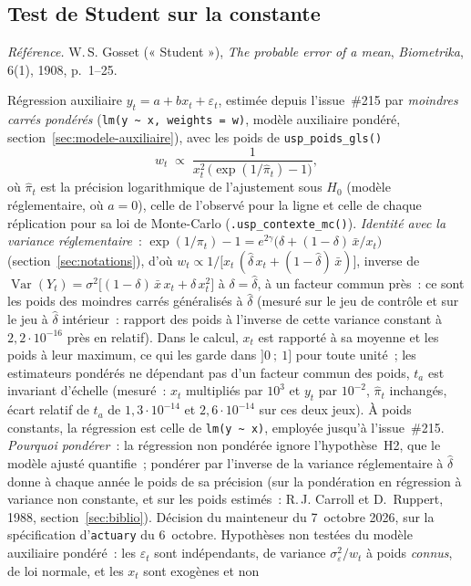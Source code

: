 \documentclass[a4paper,11pt]{article}
\newcommand{\code}[1]{\texttt{\small #1}}
\newcommand{\refl}[1]{{\small\textcolor{maincolor!70!black}{\textit{Référence.} #1}}\par\smallskip}
\newcounter{ficheid}
\newenvironment{fiche}[1]{%
  \stepcounter{ficheid}%
  \phantomsection
  \subsection{#1}%
  \label{fiche:\theficheid}%
}{%
  \end{description}\vspace{0.5em}%
}
\newcommand{\Cadre}{%
  \begin{description}[leftmargin=0pt, style=unboxed, itemsep=3pt, topsep=3pt, parsep=2pt]%
  \item[\textcolor{financeblue}{\textbf{1. Cadre, notations et hypothèses de validité (non testées).}}]}
\begin{document}
\begin{fiche}{Test de Student sur la constante}
\label{fiche:student-constante}%
\refl{W.\,S. Gosset (« Student »), \emph{The probable error of a mean}, \emph{Biometrika}, 6(1),
1908, p.~1--25.}
\Cadre
Régression auxiliaire $y_t = a + b x_t + \varepsilon_t$, estimée depuis l'issue~\#215 par
\emph{moindres carrés pondérés} (\code{lm(y \textasciitilde\ x, weights = w)}, modèle auxiliaire
pondéré, section~\ref{sec:modele-auxiliaire}), avec les poids de \code{usp\_poids\_gls()}
\[
  w_t \;\propto\; \frac{1}{x_t^2\,\big(\exp(1/\hat\pi_t) - 1\big)},
\]
où $\hat\pi_t$ est la précision logarithmique de l'ajustement sous $H_0$ (modèle réglementaire,
où $a = 0$), celle de l'observé pour la ligne et celle de chaque réplication pour sa loi de
Monte-Carlo (\code{.usp\_contexte\_mc()}). \emph{Identité avec la variance réglementaire}~:
$\exp(1/\pi_t) - 1 = e^{2\gamma}\big(\delta + (1-\delta)\,\bar x/x_t\big)$
(section~\ref{sec:notations}), d'où
$w_t \propto 1/\big[x_t\,(\hat\delta\, x_t + (1-\hat\delta)\,\bar x)\big]$, inverse de
$\operatorname{Var}(Y_t) = \sigma^2\big[(1-\delta)\,\bar x\,x_t + \delta\,x_t^2\big]$ à
$\delta = \hat\delta$, à un facteur commun près~: ce sont les poids des moindres carrés
généralisés à $\hat\delta$ (mesuré sur le jeu de contrôle et sur le jeu à $\hat\delta$ intérieur~:
rapport des poids à l'inverse de cette variance constant à $2{,}2\cdot 10^{-16}$ près en relatif).
Dans le calcul, $x_t$ est rapporté à sa moyenne et les poids à leur maximum, ce qui les garde dans
$]0~;~1]$ pour toute unité~; les estimateurs pondérés ne dépendant pas d'un facteur commun des
poids, $t_a$ est invariant d'échelle (mesuré~: $x_t$ multipliés par $10^{3}$ et $y_t$ par
$10^{-2}$, $\hat\pi_t$ inchangés, écart relatif de $t_a$ de $1{,}3\cdot 10^{-14}$ et
$2{,}6\cdot 10^{-14}$ sur ces deux jeux). À poids constants, la régression est celle de
\code{lm(y \textasciitilde\ x)}, employée jusqu'à l'issue~\#215. \emph{Pourquoi pondérer}~: la
régression non pondérée ignore l'hypothèse~H2, que le modèle ajusté quantifie~; pondérer par
l'inverse de la variance réglementaire à $\hat\delta$ donne à chaque année le poids de sa
précision (sur la pondération en régression à variance non constante, et sur les poids estimés~:
R.\,J. Carroll et D.~Ruppert, 1988, section~\ref{sec:biblio}). Décision du mainteneur du
7~octobre 2026, sur la spécification d'\code{actuary} du 6~octobre. Hypothèses non testées du
modèle auxiliaire pondéré~: les $\varepsilon_t$ sont indépendants, de variance
$\sigma_\varepsilon^2/w_t$ à poids \emph{connus}, de loi normale, et les $x_t$ sont exogènes et non

\end{fiche}
\end{document}
